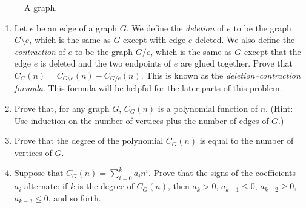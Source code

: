 \documentclass[11pt]{article}
\begin{document}
\begin{enumerate}
\begin{figure}[h]
\medskip
\caption{A graph.}
\end{figure}


\begin{enumerate}
\item Let $e$ be an edge of a graph $G$. We define the \emph{deletion} of
$e$ to be the graph $G\setminus e$, which is the same as $G$ except with edge $e$
deleted. We also define the \emph{contraction} of $e$ to be the graph $G/e$,
which is the same as $G$ except that the edge $e$ is deleted and the two endpoints of $e$
are glued together. Prove that $C_G(n)=C_{G\setminus e}(n)-C_{G/e}(n)$.
This is known as the \emph{deletion--contraction formula}. This
formula will be helpful for the later parts of this problem.

\item Prove that, for any graph $G$, $C_G(n)$ is a polynomial function of $n$.
(Hint: Use induction on the number of vertices plus the number of edges of $G$.)

\item Prove that the degree of the polynomial $C_G(n)$ is equal to the number of vertices of $G$.

\item Suppose that $C_G(n)=\sum_{i=0}^k a_i n^i$. Prove that the signs
of the coefficients $a_i$ alternate: if $k$ is the degree of $C_G(n)$,
then $a_k>0$, $a_{k-1}\le 0$, $a_{k-2}\ge 0$, $a_{k-3}\le 0$, and so forth.
\end{enumerate}

\end{enumerate}
\end{document}

